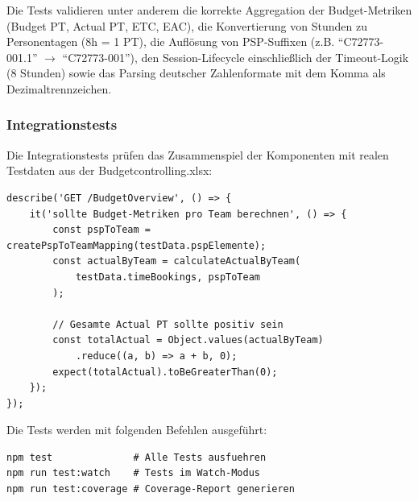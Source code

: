Die Tests validieren unter anderem die korrekte Aggregation der Budget-Metriken (Budget PT, Actual PT, ETC, EAC), die Konvertierung von Stunden zu Personentagen (8h = 1 PT), die Auflösung von PSP-Suffixen (z.B. \enquote{C72773-001.1} $\rightarrow$ \enquote{C72773-001}), den Session-Lifecycle einschließlich der Timeout-Logik (8 Stunden) sowie das Parsing deutscher Zahlenformate mit dem Komma als Dezimaltrennzeichen.

\subsubsection{Integrationstests}

Die Integrationstests prüfen das Zusammenspiel der Komponenten mit realen Testdaten aus der Budgetcontrolling.xlsx:

\begin{lstlisting}[caption={Beispiel Integrationstest}, label={lst:integration-test}]
describe('GET /BudgetOverview', () => {
    it('sollte Budget-Metriken pro Team berechnen', () => {
        const pspToTeam = createPspToTeamMapping(testData.pspElemente);
        const actualByTeam = calculateActualByTeam(
            testData.timeBookings, pspToTeam
        );

        // Gesamte Actual PT sollte positiv sein
        const totalActual = Object.values(actualByTeam)
            .reduce((a, b) => a + b, 0);
        expect(totalActual).toBeGreaterThan(0);
    });
});
\end{lstlisting}

Die Tests werden mit folgenden Befehlen ausgeführt:

\begin{lstlisting}[caption={Test-Befehle}, label={lst:test-commands}]
npm test              # Alle Tests ausfuehren
npm run test:watch    # Tests im Watch-Modus
npm run test:coverage # Coverage-Report generieren
\end{lstlisting}
